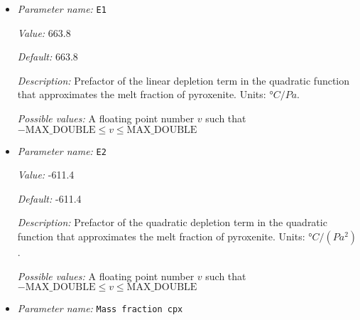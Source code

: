 \begin{itemize}
{\it Value:} 0


{\it Default:} 0


{\it Description:} If compositional fields are used, then one would frequently want to make the density depend on these fields. In this simple material model, we make the following assumptions: if no compositional fields are used in the current simulation, then the density is simply the usual one with its linear dependence on the temperature. If there are compositional fields, then the density only depends on the first one in such a way that the density has an additional term of the kind $+\Delta \rho \; c_1(\mathbf x)$. This parameter describes the value of $\Delta \rho$. Units: $kg/m^3/\textrm{unit change in composition}$.


{\it Possible values:} A floating point number $v$ such that $-\text{MAX\_DOUBLE} \leq v \leq \text{MAX\_DOUBLE}$
\item {\it Parameter name:} {\tt E1}
\label{parameters:Material model/Latent heat melt/E1}


{\it Value:} 663.8


{\it Default:} 663.8


{\it Description:} Prefactor of the linear depletion term in the quadratic function that approximates the melt fraction of pyroxenite. Units: $°C/Pa$.


{\it Possible values:} A floating point number $v$ such that $-\text{MAX\_DOUBLE} \leq v \leq \text{MAX\_DOUBLE}$
\item {\it Parameter name:} {\tt E2}
\label{parameters:Material model/Latent heat melt/E2}


{\it Value:} -611.4


{\it Default:} -611.4


{\it Description:} Prefactor of the quadratic depletion term in the quadratic function that approximates the melt fraction of pyroxenite. Units: $°C/(Pa^2)$.


{\it Possible values:} A floating point number $v$ such that $-\text{MAX\_DOUBLE} \leq v \leq \text{MAX\_DOUBLE}$
\item {\it Parameter name:} {\tt Mass fraction cpx}
\label{parameters:Material model/Latent heat melt/Mass fraction cpx}



\end{itemize}
